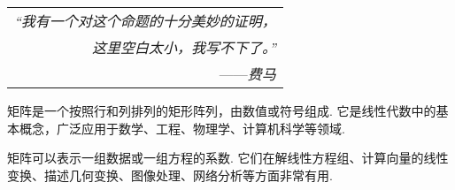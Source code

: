 \begin{flushright}
    \begin{tabular}{r||}
        \textit{“我有一个对这个命题的十分美妙的证明，}\\
        \textit{这里空白太小，我写不下了。”}\\
        ——\textit{费马}
    \end{tabular}
\end{flushright}

矩阵是一个按照行和列排列的矩形阵列，由数值或符号组成. 它是线性代数中的基本概念，广泛应用于数学、工程、物理学、计算机科学等领域. 

矩阵可以表示一组数据或一组方程的系数. 它们在解线性方程组、计算向量的线性变换、描述几何变换、图像处理、网络分析等方面非常有用. 
